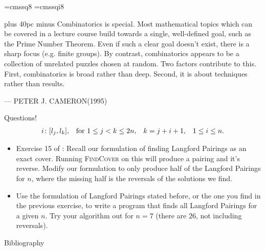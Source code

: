 \documentclass[aspectratio=169, handout]{beamer}
\begin{document}
\font\eightss=cmssq8
\font\eightssi=cmssqi8
\newcommand\quoteAuthorDate[3]{\begingroup
  \baselineskip 10pt
  \parfillskip 0pt
  \interlinepenalty 10000 %
  \leftskip 0pt plus 40pc minus \parindent
  \let\rm=\eightss
  \let\sl=\eightssi
  \everypar{\sl}#1\par
  \nobreak\smallskip
  \noindent\rm--- #2\unskip\enspace(#3)\par
  \endgroup}
\begin{frame}
    \begin{center}
        \item \quoteAuthorDate{Combinatorics is special. Most mathematical topics which can be covered in a lecture course build towards a single, well-defined goal, such as the Prime Number Theorem. Even if such a clear goal doesn’t exist, there is a sharp focus (e.g. finite groups). By contrast, combinatorics appears to be a collection of unrelated puzzles chosen at random. Two factors contribute to this. First, combinatorics is broad rather than deep. Second, it is about techniques rather than results.}{PETER J. CAMERON}{\color{sigma@mainblue}1995}
    \end{center}
\end{frame}

\begin{frame}{Questions!}
    \begin{align*}
        i\colon \bqty{l_j, l_k}, & & \text{for } 1 \leq j < k \leq 2n, & & k = j + i + 1, & & 1 \leq i \leq n.
    \end{align*} \vspace{-25pt}
    \begin{itemize}
        \item \textcolor{sigma@alertred}{Exercise 15 of \cite[Chapter~7.2.2.1]{TAOCP4B}:} Recall our formulation of finding Langford Pairings as an exact cover. Running \textsc{FindCover} on this will produce a pairing and it's reverse. Modify our formulation to only produce half of the Langford Pairings for $n$, where the missing half is the reversals of the solutions we find. \vspace{10pt}
        \item Use the formulation of Langford Pairings stated before, or the one you find in the previous exercise, to write a program that finds all Langford Pairings for a given $n$. Try your algorithm out for $n = 7$ (there are $26$, not including reversals).
    \end{itemize}
    
\end{frame}

\begin{frame}{Bibliography}
    
    {\scriptsize }
\end{frame}
\end{document}
